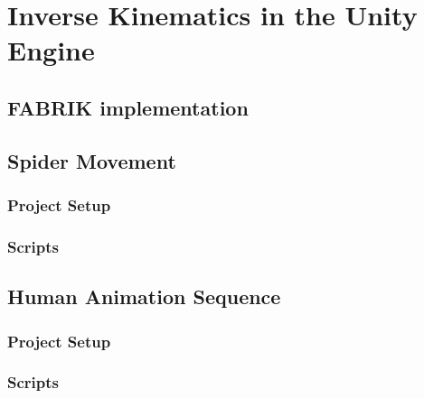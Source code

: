 \chapter{Inverse Kinematics in the Unity Engine} 
\section{FABRIK implementation}
\section{Spider Movement}
\subsection{Project Setup}
\subsection{Scripts}
\section{Human Animation Sequence}
\subsection{Project Setup}
\subsection{Scripts}
